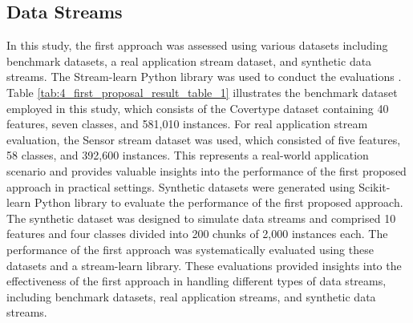 \subsection{Data Streams}
In this study, the first approach was assessed using various datasets including benchmark datasets, a real application stream dataset, and synthetic data streams. The Stream-learn Python library was used to conduct the evaluations \cite{dries2009adaptive}. Table \ref{tab:4_first_proposal_result_table_1} illustrates the benchmark dataset employed in this study, which consists of the Covertype dataset containing 40 features, seven classes, and 581,010 instances. For real application stream evaluation, the Sensor stream dataset was used, which consisted of five features, 58 classes, and 392,600 instances. This represents a real-world application scenario and provides valuable insights into the performance of the first proposed approach in practical settings. Synthetic datasets were generated using Scikit-learn Python library to evaluate the performance of the first proposed approach. The synthetic dataset was designed to simulate data streams and comprised 10 features and four classes divided into 200 chunks of 2,000 instances each. The performance of the first approach was systematically evaluated using these datasets and a stream-learn library. These evaluations provided insights into the effectiveness of the first approach in handling different types of data streams, including benchmark datasets, real application streams, and synthetic data streams.

\begin{table}[H]
  \centering
  \caption{Summary of Dataset Characteristics Utilized in the PA1 Experimental.}
  \label{tab:4_first_proposal_result_table_1}
  \end{table}

